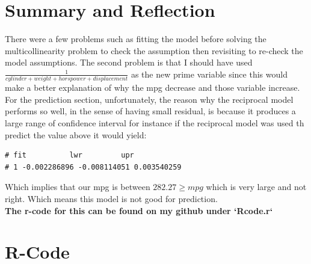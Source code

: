 \documentclass[11pt]{article} %
\begin{document}
\section{Summary and Reflection}
There were a few problems such as fitting the model before solving the multicollinearity problem to check the assumption then revisiting to re-check the model assumptions. The second problem is that I should have used $\frac{1}{cylinder+weight+horspower+displacement}$ as the new prime variable since this would make a better explanation of why the mpg decrease and those variable increase. For the prediction section, unfortunately, the reason why the reciprocal model performs so well, in the sense of having small residual, is because it produces a large range of confidence interval for instance if the reciprocal model was used th predict the value above it would yield:
\begin{lstlisting}
# fit          lwr         upr
# 1 -0.002286896 -0.008114051 0.003540259
\end{lstlisting}
Which implies that our mpg is between $282.27 \geq mpg$ which is very large and not right. Which means this model is not good for prediction.\\
\textbf{The r-code for this can be found on my github under `Rcode.r`}
\newpage
\section{R-Code}
\end{document}
